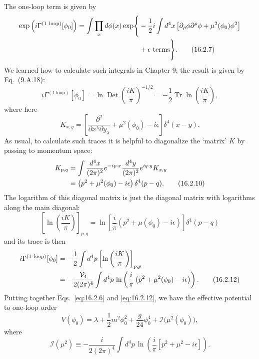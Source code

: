 The one-loop term is given by
\begin{align}
 \exp\left(i\Gamma^{(1\ \mathrm{loop})}[\phi_0]\right)
 = \int\prod_x d\phi(x)\exp\Biggl\{&-\frac{1}{2}i\int d^4x
 \left[\partial_\rho\phi\partial^\rho\phi+\mu^2(\phi_0)\phi^2\right]
 \notag\\
 &{}+\epsilon\ \text{terms}\Biggr\} .
 \tag{16.2.7}
 \label{eq:16.2.7}
\end{align}
We learned how to calculate such integrals in Chapter 9; the result is
given by Eq.~(9.A.18):
\begin{equation}
 i\Gamma^{(1\ \mathrm{loop})}[\phi_0]
 = \ln\operatorname{Det}\left(\frac{iK}{\pi}\right)^{-1/2}
 = -\frac{1}{2}\operatorname{Tr}\ln\left(\frac{iK}{\pi}\right) ,
 \tag{16.2.8}
 \label{eq:16.2.8}
\end{equation}
where here
\begin{equation}
 K_{x,y} = \left[\frac{\partial^2}{\partial x^\lambda\partial y_\lambda}
 +\mu^2(\phi_0)-i\epsilon\right]\delta^4(x-y) .
 \tag{16.2.9}
 \label{eq:16.2.9}
\end{equation}
As usual, to calculate such traces it is helpful to diagonalize the `matrix'
$K$ by passing to momentum space:
\begin{align}
 K_{p,q} &= \int\frac{d^4x}{(2\pi)^2}e^{-ip\cdot x}
 \frac{d^4y}{(2\pi)^2}e^{iq\cdot y}K_{x,y} \notag\\
 &= \left(p^2+\mu^2(\phi_0)-i\epsilon\right)\delta^4(p-q) .
 \tag{16.2.10}
 \label{eq:16.2.10}
\end{align}
The logarithm of this diagonal matrix is just the diagonal matrix with
logarithms along the main diagonal:
\begin{equation}
 \left[\ln\left(\frac{iK}{\pi}\right)\right]_{p,q}
 = \ln\left[\frac{i}{\pi}\left(p^2+\mu(\phi_0)-i\epsilon\right)\right]\delta^4(p-q)
 \tag{16.2.11}
 \label{eq:16.2.11}
\end{equation}
and its trace is then
\begin{align}
 i\Gamma^{(1\ \mathrm{loop})}[\phi_0]
 &= -\frac{1}{2}\int d^4p\left[\ln\left(\frac{iK}{\pi}\right)\right]_{p,p} \notag\\
 &= -\frac{\mathcal{V}_4}{2(2\pi)^4}\int d^4p\,
 \ln\left(\frac{i}{\pi}\left(p^2+\mu^2(\phi_0)-i\epsilon\right)\right) .
 \tag{16.2.12}
 \label{eq:16.2.12}
\end{align}
Putting together Eqs.~\eqref{eq:16.2.6} and \eqref{eq:16.2.12}, we have the effective potential
to one-loop order
\begin{equation}
 V(\phi_0) = \lambda+\frac{1}{2}m^2\phi_0^2+\frac{g}{24}\phi_0^4
 +\mathcal{I}\bigl(\mu^2(\phi_0)\bigr) ,
 \tag{16.2.13}
 \label{eq:16.2.13}
\end{equation}
where
\begin{equation}
 \mathcal{I}(\mu^2) \equiv -\frac{i}{2(2\pi)^4}\int d^4p\,
 \ln\left(\frac{i}{\pi}\left[p^2+\mu^2-i\epsilon\right]\right) .
 \tag{16.2.14}
 \label{eq:16.2.14}
\end{equation}


